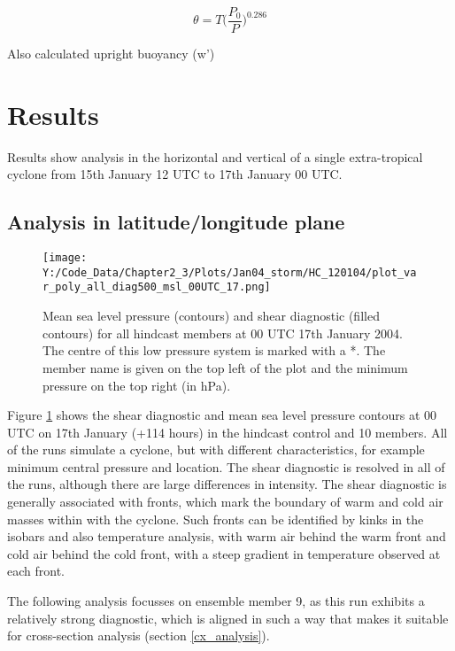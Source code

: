 \begin{equation} \label{eq_theta}
\theta =  T \big(\frac{P_0}{P}) ^{0.286}
\end{equation}

Also calculated upright buoyancy (w'{\alpha})

\section{Results}

Results show analysis in the horizontal and vertical of a single extra-tropical cyclone from 15th January 12 UTC to 17th January 00 UTC. 

\subsection{Analysis in latitude/longitude plane}

\begin{figure}
	\texttt{[image: Y:/Code\_Data/Chapter2\_3/Plots/Jan04\_storm/HC\_120104/plot\_var\_poly\_all\_diag500\_msl\_00UTC\_17.png]}
	\caption{Mean sea level pressure (contours) and shear diagnostic (filled contours) for all hindcast members at 00 UTC 17th January 2004. The centre of this low pressure system is marked with a *. The member name is given on the top left of the plot and the minimum pressure on the top right (in hPa). }\label{fig:HC_all}
\end{figure}

Figure \ref{fig:HC_all} shows the shear diagnostic and mean sea level pressure contours at 00 UTC on 17th January (+114 hours) in the hindcast control and 10 members. All of the runs simulate a cyclone, but with different characteristics, for example minimum central pressure and location. The shear diagnostic is resolved in all of the runs, although there are large differences in intensity. The shear diagnostic is generally associated with fronts, which mark the boundary of warm and cold air masses within with the cyclone. Such fronts can be identified by kinks in the isobars and also temperature analysis, with warm air behind the warm front and cold air behind the cold front, with a steep gradient in temperature observed at each front.

The following analysis focusses on ensemble member 9, as this run exhibits a relatively strong diagnostic, which is aligned in such a way that makes it suitable for cross-section analysis (section \ref{cx_analysis}).

